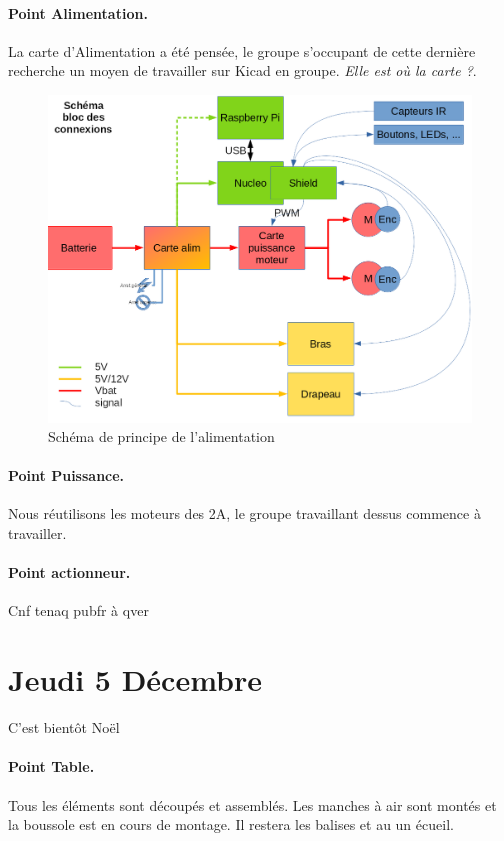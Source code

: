 \documentclass[a4paper,10pt]{report}
\theoremstyle{definition}
\begin{document}
\begin{spacing}{1.5}
\paragraph*{Point Alimentation.}
La carte d'Alimentation a été pensée, le groupe s'occupant de cette dernière
recherche un moyen de travailler sur Kicad en groupe. \textit{Elle est où la
  carte ?}.
\begin{figure}[h!]
  \center
  \includegraphics[scale=0.4]{schema_bloc_connexions.png}
  \caption{Schéma de principe de l'alimentation}
\end{figure}

\paragraph*{Point Puissance.}
Nous réutilisons les moteurs des 2A, le groupe travaillant dessus commence à
travailler.

\paragraph*{Point actionneur.}
Cnf tenaq pubfr à qver

\newpage
\section*{Jeudi 5 Décembre}
C'est bientôt Noël
\paragraph*{Point Table.}
Tous les éléments sont découpés et assemblés. Les manches à air sont montés et
la boussole est en cours de montage. Il restera les balises et au un écueil.


\end{spacing}
\end{document}

